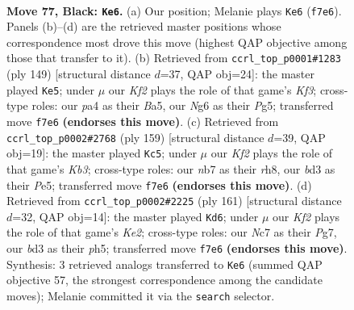 \documentclass[11pt]{article}
\begin{document}
\clearpage

\begin{figure}[p]\centering
\begin{subfigure}{0.46\textwidth}\centering
\resizebox{\linewidth}{!}{%
\newchessgame
\chessboard[
  setfen={8/1Nn2k2/6n1/p7/Pb1pP3/1P1B3p/4P3/2K5 b - - 21 77},
  showmover=false,
  pgfstyle=straightmove, color=movearrow, markmove={f7-e6}
]}
\caption{}
\end{subfigure}\hfill
\begin{subfigure}{0.46\textwidth}\centering
\resizebox{\linewidth}{!}{%
\newchessgame
\chessboard[
  setfen={8/8/5k2/b1n3pp/2B5/1P2PK1P/8/5N2 b - - 3 75},
  showmover=false,
  pgfstyle=straightmove, color=movearrow, markmove={f6-e5}
]}
\caption{}
\end{subfigure}
\\[4pt]
\begin{subfigure}{0.46\textwidth}\centering
\resizebox{\linewidth}{!}{%
\newchessgame
\chessboard[
  setfen={7R/8/1k1p4/3Pp2p/4P1bP/r7/5KB1/8 b - - 58 80},
  showmover=false,
  pgfstyle=straightmove, color=movearrow, markmove={b6-c5}
]}
\caption{}
\end{subfigure}\hfill
\begin{subfigure}{0.46\textwidth}\centering
\resizebox{\linewidth}{!}{%
\newchessgame
\chessboard[
  setfen={8/3nk1p1/6Pp/1Pp4P/2b2K2/2N2B2/8/8 b - - 10 81},
  showmover=false,
  pgfstyle=straightmove, color=movearrow, markmove={e7-d6}
]}
\caption{}
\end{subfigure}
\caption{\textbf{Move 77, Black: \texttt{Ke6}.} (a) Our position; Melanie plays \texttt{Ke6} (\texttt{f7e6}). Panels (b)--(d) are the retrieved master positions whose correspondence most drove this move (highest QAP objective among those that transfer to it). (b) Retrieved from \texttt{ccrl\_top\_p0001\#1283} (ply 149) [structural distance $d$=37, QAP obj=24]: the master played \texttt{Ke5}; under $\mu$ our \emph{Kf2} plays the role of that game's \emph{Kf3}; cross-type roles: our \emph{p}a4 as their \emph{B}a5, our \emph{N}g6 as their \emph{P}g5; transferred move \texttt{f7e6} \textbf{(endorses this move)}. (c) Retrieved from \texttt{ccrl\_top\_p0002\#2768} (ply 159) [structural distance $d$=39, QAP obj=19]: the master played \texttt{Kc5}; under $\mu$ our \emph{Kf2} plays the role of that game's \emph{Kb3}; cross-type roles: our \emph{n}b7 as their \emph{r}h8, our \emph{b}d3 as their \emph{P}e5; transferred move \texttt{f7e6} \textbf{(endorses this move)}. (d) Retrieved from \texttt{ccrl\_top\_p0002\#2225} (ply 161) [structural distance $d$=32, QAP obj=14]: the master played \texttt{Kd6}; under $\mu$ our \emph{Kf2} plays the role of that game's \emph{Ke2}; cross-type roles: our \emph{N}c7 as their \emph{P}g7, our \emph{b}d3 as their \emph{p}h5; transferred move \texttt{f7e6} \textbf{(endorses this move)}. Synthesis: 3 retrieved analogs transferred to \texttt{Ke6} (summed QAP objective 57, the strongest correspondence among the candidate moves); Melanie committed it via the \texttt{search} selector.}
\label{fig:thought-m153}
\end{figure}
\end{document}
